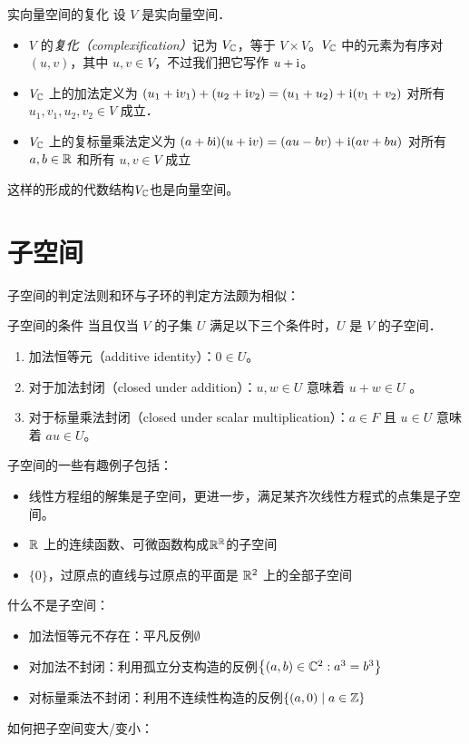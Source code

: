 \begin{definition}{实向量空间的复化}
    设 \(V\) 是实向量空间．
    \begin{itemize}
        \item \(V\) 的\emph{复化（complexification）}记为
            \(V_{\mathbb{C}}\)，等于 \(V \times
            V\)。\(V_{\mathbb{C}}\)
            中的元素为有序对 \((u, v)\)，其中
            \(u, v \in V\)，不过我们把它写作 \(u + \mathrm{i} \)。
        \item \(V_{\mathbb{C}}\) 上的加法定义为
            \((u_1 + \mathrm{i} v_1) + (u_2 + \mathrm{i} v_2) = (u_1 +
            u_2) + \mathrm{i} (v_1 + v_2)\)
            对所有 \(u_1, v_1, u_2, v_2 \in V\) 成立．
        \item \(V_{\mathbb{C}}\) 上的复标量乘法定义为
            \((a + b\mathrm{i}) (u + \mathrm{i} v) =
                (au - bv) +
            \mathrm{i} (av + bu)\)
            对所有 \(a, b \in \mathbb{R}\) 和所有 \(u, v \in V\) 成立
    \end{itemize}
\end{definition}
这样的形成的代数结构\(V_{\mathbb{C}}\)也是向量空间。

\section{子空间}
子空间的判定法则和环与子环的判定方法颇为相似：
\begin{theorem}{子空间的条件}
    当且仅当 \(V\) 的子集 \(U\) 满足以下三个条件时，\(U\) 是 \(V\) 的子空间．
    \begin{enumerate}
        \item 加法恒等元（additive identity）：\(0 \in U\)。
        \item 对于加法封闭（closed under addition）：\(u, w \in U\)
            意味着 \(u + w \in U\) 。
        \item 对于标量乘法封闭（closed under scalar
            multiplication）：\(a \in F\)  且 \(u \in U\) 意味着
            \(au \in U\)。
    \end{enumerate}
\end{theorem}
子空间的一些有趣例子包括：
\begin{itemize}
    \item 线性方程组的解集是子空间，更进一步，满足某齐次线性方程式的点集是子空间。
    \item \(\mathbb{R}\)
        上的连续函数、可微函数构成\(\mathbb{R}^{\mathbb{R}}\)的子空间
    \item \(\{0\}\)，过原点的直线与过原点的平面是 \(\mathbb{R}^{2}\) 上的全部子空间
\end{itemize}
什么不是子空间：
\begin{itemize}\label{item:subspace counterexample}
    \item 加法恒等元不存在：平凡反例\(\emptyset\)
    \item 对加法不封闭：利用孤立分支构造的反例\(\left\{ (a,b)\in
        \mathbb{C}^{2}: a^{3}=b^{3}\right\}\)
    \item 对标量乘法不封闭：利用不连续性构造的反例\(\left\{(a,0)\mid a\in
        \mathbb{Z}\right\}\)
\end{itemize}

如何把子空间变大/变小：

